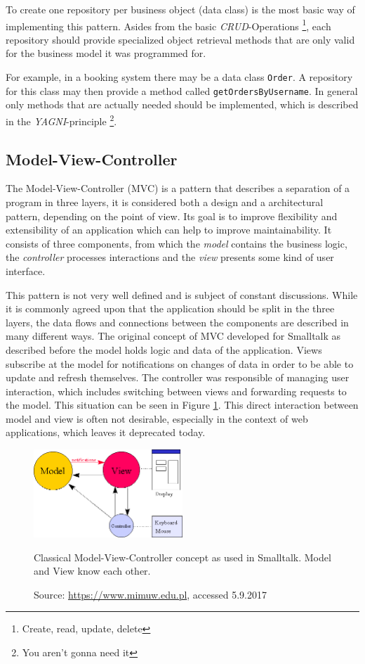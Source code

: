 To create one repository per business object (data class) is the most basic way of implementing this pattern. Asides from the basic \emph{CRUD}-Operations \footnote{Create, read, update, delete}, each repository should provide specialized object retrieval methods that are only valid for the business model it was programmed for. 

For example, in a booking system there may be a data class \texttt{Order}. A repository for this class may then provide a method called \texttt{getOrdersByUsername}. In general only methods that are actually needed should be implemented, which is described in the \emph{YAGNI}-principle \footnote{You aren't gonna need it}.


\subsection{Model-View-Controller}
The Model-View-Controller (MVC) is a pattern that describes a separation of a program in three layers, it is considered both a design and a architectural pattern, depending on the point of view.  Its goal is to improve flexibility and extensibility of an application which can help to improve maintainability. It consists of three components, from which the \emph{model} contains the business logic, the \emph{controller} processes interactions and the \emph{view} presents some kind of user interface. 

This pattern is not very well defined and is subject of constant discussions. While it is commonly agreed upon that the application should be split in the three layers, the data flows and connections between the components are described in many different ways. The original concept of MVC developed for Smalltalk as described before the model holds logic and data of the application. Views subscribe at the model for notifications on changes of data in order to be able to update and refresh themselves. The controller was responsible of managing user interaction, which includes switching between views and forwarding requests to the model. This situation can be seen in Figure \ref{fig:mvc-smalltalk}. This direct interaction between model and view is often not desirable, especially in the context of web applications, which leaves it deprecated today. 

\begin{figure}[htbp]
	\centering
	\label{fig:mvc-smalltalk}
	
	\includegraphics[width=0.5\textwidth]{./content/pictures/mvc-smalltalk.jpg}
	\caption{Classical Model-View-Controller concept as used in Smalltalk. Model and View know each other.}
	\caption*{Source: \href{https://www.mimuw.edu.pl/\~sl/teaching/00\_01/Delfin\_EC/Overviews/MVC.htm}{https://www.mimuw.edu.pl}, accessed 5.9.2017}
\end{figure}


